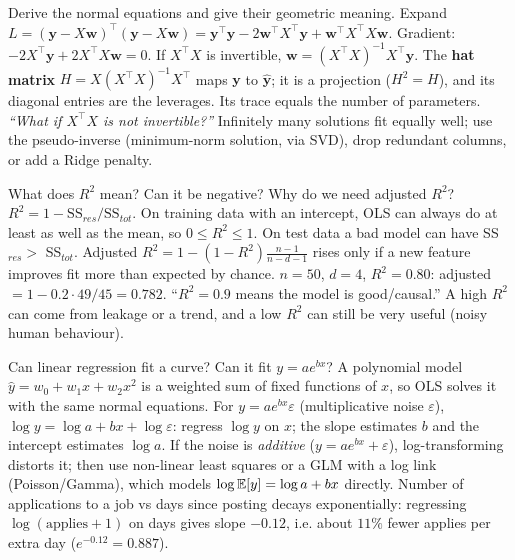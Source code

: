 \begin{qa}{Derive the normal equations and give their geometric meaning.}
\why Expand $L = (\mathbf y - X\mathbf w)^\top(\mathbf y - X\mathbf w) = \mathbf y^\top\mathbf y - 2\mathbf w^\top X^\top\mathbf y + \mathbf w^\top X^\top X\mathbf w$.
Gradient: $-2X^\top\mathbf y + 2X^\top X\mathbf w = 0$. If $X^\top X$ is invertible, $\mathbf w = (X^\top X)^{-1}X^\top\mathbf y$.
The \textbf{hat matrix} $H = X(X^\top X)^{-1}X^\top$ maps $\mathbf y$ to $\hat{\mathbf y}$; it is a projection ($H^2 = H$),
and its diagonal entries are the leverages. Its trace equals the number of parameters.
\pushes \emph{``What if $X^\top X$ is not invertible?''} Infinitely many solutions fit equally well; use the
pseudo-inverse (minimum-norm solution, via SVD), drop redundant columns, or add a Ridge penalty.
\end{qa}

\begin{qa}{What does $R^2$ mean? Can it be negative? Why do we need adjusted $R^2$?}
\why $R^2 = 1 - \text{SS}_{res}/\text{SS}_{tot}$. On training data with an intercept, OLS can always do at least as
well as the mean, so $0 \le R^2 \le 1$. On test data a bad model can have SS$_{res} > $ SS$_{tot}$. Adjusted
$R^2 = 1 - (1-R^2)\frac{n-1}{n-d-1}$ rises only if a new feature improves fit more than expected by chance.
\worked $n = 50$, $d = 4$, $R^2 = 0.80$: adjusted $= 1 - 0.2\cdot49/45 = 0.782$.
\pitfall ``$R^2 = 0.9$ means the model is good/causal.'' A high $R^2$ can come from leakage or a trend, and a low
$R^2$ can still be very useful (noisy human behaviour).
\end{qa}

\begin{qa}{\deep Can linear regression fit a curve? Can it fit $y = a e^{bx}$?}
\why A polynomial model $\hat y = w_0 + w_1x + w_2x^2$ is a weighted sum of fixed functions of $x$, so OLS solves it
with the same normal equations. For $y = ae^{bx}\varepsilon$ (multiplicative noise $\varepsilon$), $\log y = \log a + bx +
\log\varepsilon$: regress $\log y$ on $x$; the slope estimates $b$ and the intercept estimates $\log a$. If the
noise is \emph{additive} ($y = ae^{bx} + \varepsilon$), log-transforming distorts it; then use non-linear least
squares or a GLM with a log link (Poisson/Gamma), which models $\log\mathbb{E}[y] = \log a + bx$ directly.
\worked Number of applications to a job vs days since posting decays exponentially: regressing $\log(\text{applies}+1)$
on days gives slope $-0.12$, i.e. about $11\%$ fewer applies per extra day ($e^{-0.12} = 0.887$).
\end{qa}

